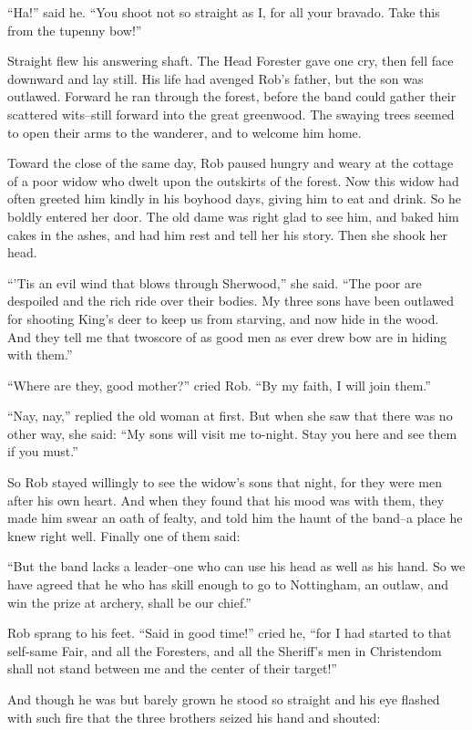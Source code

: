 ``Ha!'' said he. ``You shoot not so straight as I, for all your bravado.
Take this from the tupenny bow!''

Straight flew his answering shaft. The Head Forester gave one cry, then
fell face downward and lay still. His life had avenged Rob's father, but
the son was outlawed. Forward he ran through the forest, before the band
could gather their scattered wits--still forward into the great
greenwood. The swaying trees seemed to open their arms to the wanderer,
and to welcome him home.

Toward the close of the same day, Rob paused hungry and weary at the
cottage of a poor widow who dwelt upon the outskirts of the forest. Now
this widow had often greeted him kindly in his boyhood days, giving him
to eat and drink. So he boldly entered her door. The old dame was right
glad to see him, and baked him cakes in the ashes, and had him rest and
tell her his story. Then she shook her head.

``'Tis an evil wind that blows through Sherwood,'' she said. ``The poor
are despoiled and the rich ride over their bodies. My three sons have
been outlawed for shooting King's deer to keep us from starving, and now
hide in the wood. And they tell me that twoscore of as good men as ever
drew bow are in hiding with them.''

``Where are they, good mother?'' cried Rob. ``By my faith, I will join
them.''

``Nay, nay,'' replied the old woman at first. But when she saw that
there was no other way, she said: ``My sons will visit me to-night. Stay
you here and see them if you must.''

So Rob stayed willingly to see the widow's sons that night, for they
were men after his own heart. And when they found that his mood was with
them, they made him swear an oath of fealty, and told him the haunt of
the band--a place he knew right well. Finally one of them said:

``But the band lacks a leader--one who can use his head as well as his
hand. So we have agreed that he who has skill enough to go to
Nottingham, an outlaw, and win the prize at archery, shall be our
chief.''

Rob sprang to his feet. ``Said in good time!'' cried he, ``for I had
started to that self-same Fair, and all the Foresters, and all the
Sheriff's men in Christendom shall not stand between me and the center
of their target!''

And though he was but barely grown he stood so straight and his eye
flashed with such fire that the three brothers seized his hand and
shouted:

